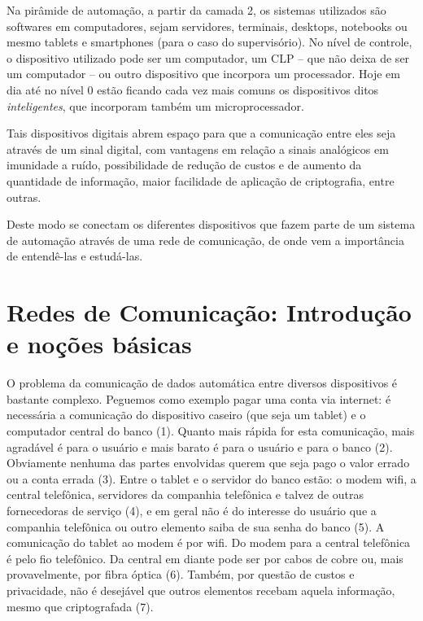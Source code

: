 Na pirâmide de automação, a partir da camada 2, os sistemas utilizados são softwares em computadores, sejam servidores, terminais, desktops, notebooks ou mesmo tablets e smartphones (para o caso do supervisório). No nível de controle, o dispositivo utilizado pode ser um computador, um CLP -- que não deixa de ser um computador -- ou outro dispositivo que incorpora um processador. Hoje em dia até no nível 0 estão ficando cada vez mais comuns os dispositivos ditos \emph{inteligentes}, que incorporam também um microprocessador.

Tais dispositivos digitais abrem espaço para que a comunicação entre eles seja através de um sinal digital, com vantagens em relação a sinais analógicos em imunidade a ruído, possibilidade de redução de custos e de aumento da quantidade de informação, maior facilidade de aplicação de criptografia, entre outras.

Deste modo se conectam os diferentes dispositivos que fazem parte de um sistema de automação através de uma rede de comunicação, de onde vem a importância de entendê-las e estudá-las.

\section{Redes de Comunicação: Introdução e noções básicas}

O problema da comunicação de dados automática entre diversos dispositivos é bastante complexo. Peguemos como exemplo pagar uma conta via internet: é necessária a comunicação do dispositivo caseiro (que seja um tablet) e o computador central do banco (1). Quanto mais rápida for esta comunicação, mais agradável é para o usuário e mais barato é para o usuário e para o banco (2). Obviamente nenhuma das partes envolvidas querem que seja pago o valor errado ou a conta errada (3). Entre o tablet e o servidor do banco estão: o modem wifi, a central telefônica, servidores da companhia telefônica e talvez de outras fornecedoras de serviço (4), e em geral não é do interesse do usuário que a companhia telefônica ou outro elemento saiba de sua senha do banco (5). A comunicação do tablet ao modem é por wifi. Do modem para a central telefônica é pelo fio telefônico. Da central em diante pode ser por cabos de cobre ou, mais provavelmente, por fibra óptica (6). Também, por questão de custos e privacidade, não é desejável que outros elementos recebam aquela informação, mesmo que criptografada (7).

